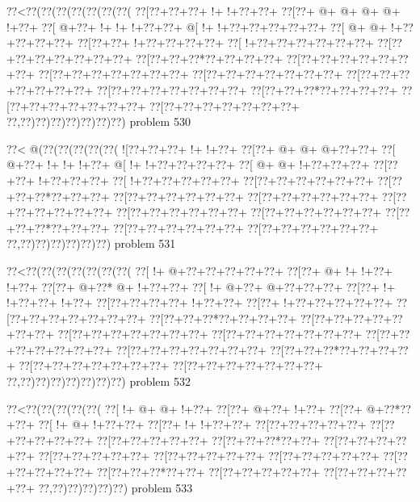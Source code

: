 \vbox{\vbox{\goo
\0??<\0??(\0??(\0??(\0??(\0??(\0??(\0??(
\0??[\0??+\0??+\0??+\- !+\- !+\0??+\0??+
\0??[\0??+\- @+\- @+\- @+\- @+\- !+\0??+
\0??[\- @+\0??+\- !+\- !+\- !+\0??+\0??+
\- @[\- !+\- !+\0??+\0??+\0??+\0??+\0??+
\0??[\- @+\- @+\- !+\0??+\0??+\0??+\0??+
\0??[\0??+\0??+\- !+\0??+\0??+\0??+\0??+
\0??[\- !+\0??+\0??+\0??+\0??+\0??+\0??+
\0??[\0??+\0??+\0??+\0??+\0??+\0??+\0??+
\0??[\0??+\0??+\0??*\0??+\0??+\0??+\0??+
\0??[\0??+\0??+\0??+\0??+\0??+\0??+\0??+
\0??[\0??+\0??+\0??+\0??+\0??+\0??+\0??+
\0??[\0??+\0??+\0??+\0??+\0??+\0??+\0??+
\0??[\0??+\0??+\0??+\0??+\0??+\0??+\0??+
\0??[\0??+\0??+\0??+\0??+\0??+\0??+\0??+
\0??[\0??+\0??+\0??*\0??+\0??+\0??+\0??+
\0??[\0??+\0??+\0??+\0??+\0??+\0??+\0??+
\0??[\0??+\0??+\0??+\0??+\0??+\0??+\0??+
\0??,\0??)\0??)\0??)\0??)\0??)\0??)\0??)
}
\hfil problem 530\hfil\break
}

\vbox{\vbox{\goo
\0??<\- @(\0??(\0??(\0??(\0??(\0??(
\- ![\0??+\0??+\0??+\- !+\- !+\0??+
\0??[\0??+\- @+\- @+\- @+\0??+\0??+
\0??[\- @+\0??+\- !+\- !+\- !+\0??+
\- @[\- !+\- !+\0??+\0??+\0??+\0??+
\0??[\- @+\- @+\- !+\0??+\0??+\0??+
\0??[\0??+\0??+\- !+\0??+\0??+\0??+
\0??[\- !+\0??+\0??+\0??+\0??+\0??+
\0??[\0??+\0??+\0??+\0??+\0??+\0??+
\0??[\0??+\0??+\0??*\0??+\0??+\0??+
\0??[\0??+\0??+\0??+\0??+\0??+\0??+
\0??[\0??+\0??+\0??+\0??+\0??+\0??+
\0??[\0??+\0??+\0??+\0??+\0??+\0??+
\0??[\0??+\0??+\0??+\0??+\0??+\0??+
\0??[\0??+\0??+\0??+\0??+\0??+\0??+
\0??[\0??+\0??+\0??*\0??+\0??+\0??+
\0??[\0??+\0??+\0??+\0??+\0??+\0??+
\0??[\0??+\0??+\0??+\0??+\0??+\0??+
\0??,\0??)\0??)\0??)\0??)\0??)\0??)
}
\hfil problem 531\hfil\break
}

\vbox{\vbox{\goo
\0??<\0??(\0??(\0??(\0??(\0??(\0??(\0??(
\0??[\- !+\- @+\0??+\0??+\0??+\0??+\0??+
\0??[\0??+\- @+\- !+\- !+\0??+\- !+\0??+
\0??[\0??+\- @+\0??*\- @+\- !+\0??+\0??+
\0??[\- !+\- @+\0??+\- @+\0??+\0??+\0??+
\0??[\0??+\- !+\- !+\0??+\0??+\- !+\0??+
\0??[\0??+\0??+\0??+\0??+\- !+\0??+\0??+
\0??[\0??+\- !+\0??+\0??+\0??+\0??+\0??+
\0??[\0??+\0??+\0??+\0??+\0??+\0??+\0??+
\0??[\0??+\0??+\0??*\0??+\0??+\0??+\0??+
\0??[\0??+\0??+\0??+\0??+\0??+\0??+\0??+
\0??[\0??+\0??+\0??+\0??+\0??+\0??+\0??+
\0??[\0??+\0??+\0??+\0??+\0??+\0??+\0??+
\0??[\0??+\0??+\0??+\0??+\0??+\0??+\0??+
\0??[\0??+\0??+\0??+\0??+\0??+\0??+\0??+
\0??[\0??+\0??+\0??*\0??+\0??+\0??+\0??+
\0??[\0??+\0??+\0??+\0??+\0??+\0??+\0??+
\0??[\0??+\0??+\0??+\0??+\0??+\0??+\0??+
\0??,\0??)\0??)\0??)\0??)\0??)\0??)\0??)
}
\hfil problem 532\hfil\break
}

\vbox{\vbox{\goo
\0??<\0??(\0??(\0??(\0??(\0??(
\0??[\- !+\- @+\- @+\- !+\0??+
\0??[\0??+\- @+\0??+\- !+\0??+
\0??[\0??+\- @+\0??*\0??+\0??+
\0??[\- !+\- @+\- !+\0??+\0??+
\0??[\0??+\- !+\- !+\0??+\0??+
\0??[\0??+\0??+\0??+\0??+\0??+
\0??[\0??+\0??+\0??+\0??+\0??+
\0??[\0??+\0??+\0??+\0??+\0??+
\0??[\0??+\0??+\0??*\0??+\0??+
\0??[\0??+\0??+\0??+\0??+\0??+
\0??[\0??+\0??+\0??+\0??+\0??+
\0??[\0??+\0??+\0??+\0??+\0??+
\0??[\0??+\0??+\0??+\0??+\0??+
\0??[\0??+\0??+\0??+\0??+\0??+
\0??[\0??+\0??+\0??*\0??+\0??+
\0??[\0??+\0??+\0??+\0??+\0??+
\0??[\0??+\0??+\0??+\0??+\0??+
\0??,\0??)\0??)\0??)\0??)\0??)
}
\hfil problem 533\hfil\break
}

